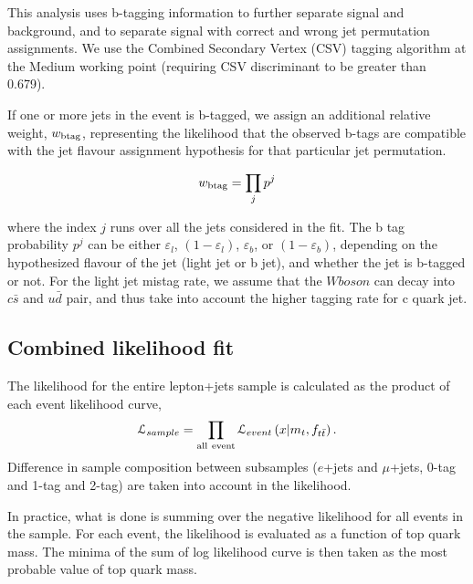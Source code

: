 This analysis uses b-tagging information to further separate
\ttbar signal and background, and to separate \ttbar signal with correct and wrong jet permutation assignments.  We use
the Combined Secondary Vertex (CSV) tagging algorithm at the Medium working point (requiring CSV discriminant to be
greater than 0.679).

If one or more jets in the event is b-tagged, we assign an additional relative weight, $w_{\rm btag}$, representing the
likelihood that the observed b-tags are compatible with the jet flavour assignment hypothesis for that particular jet
permutation.

\begin{equation}
w_{\rm btag} = \prod_{j} p^{j}
\end{equation}

where the index $j$ runs over all the jets considered in the fit.  The b tag probability $p^{j}$ can be either
$\varepsilon_{l}$, $(1 - \varepsilon_{l})$, $\varepsilon_{b}$, or $(1 - \varepsilon_{b})$, depending on the hypothesized
flavour of the jet (light jet or b jet), and whether the jet is b-tagged or not.  For the light jet mistag rate, we
assume that the $W boson$ can decay into $c\bar{s}$ and $u\bar{d}$ pair, and thus take into account the higher tagging
rate for c quark jet.


\subsection{Combined likelihood fit}
\label{ss_top_mass:likelihood_fit}

The likelihood for the entire lepton+jets sample is calculated as the product of each event likelihood curve,
\begin{equation}
\mathcal{L}_{sample} = \prod_{\rm all~event}
\mathcal{L}_{event}\left(x|m_{t},f_{t\bar{t}}\right).
\label{eq:CombinedLikelihood}
\end{equation}
Difference in sample composition between subsamples ($e$+jets and $\mu$+jets, 0-tag and 1-tag and 2-tag) are taken into
account in the likelihood.

In practice, what is done is summing over the negative likelihood for all events in the sample.  For each event, the
likelihood is evaluated as a function of top quark mass.  The minima of the sum of log likelihood curve is then taken as
the most probable value of top quark mass.

